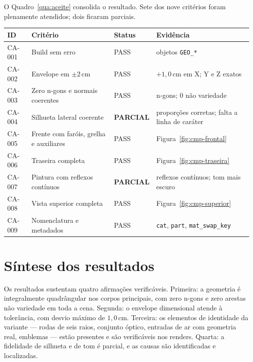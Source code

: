 O Quadro~\ref{qua:aceite} consolida o resultado. Sete dos nove crit\'erios foram plenamente
atendidos; dois ficaram parciais.

\begin{quadro}[htbp]
\centering
\caption{Resultado da verifica{\c{c}}\~ao por crit\'erio de aceita{\c{c}}\~ao}
\label{qua:aceite}
\footnotesize
\begin{tabular}{>{\raggedright\arraybackslash}p{1.4cm}>{\raggedright\arraybackslash}p{5.6cm}>{\raggedright\arraybackslash}p{1.9cm}>{\raggedright\arraybackslash}p{4.0cm}}
\toprule
\textbf{ID} & \textbf{Crit\'erio} & \textbf{Status} & \textbf{Evid\^encia} \\
\midrule
CA-001 & Build sem erro & PASS & 130 objetos \texttt{GEO\_*} \\
CA-002 & Envelope em $\pm2$\,cm & PASS & $+1,0$\,cm em X; Y e Z exatos \\
CA-003 & Zero n-gons e normais coerentes & PASS & 0 n-gons; 0 n\~ao variedade \\
CA-004 & Silhueta lateral coerente & \textbf{PARCIAL} & propor{\c{c}}\~oes corretas; falta a linha de car\'ater \\
CA-005 & Frente com far\'ois, grelha e auxiliares & PASS & Figura~\ref{fig:cmp-frontal} \\
CA-006 & Traseira completa & PASS & Figura~\ref{fig:cmp-traseira} \\
CA-007 & Pintura com reflexos cont\'inuos & \textbf{PARCIAL} & reflexos cont\'inuos; tom mais escuro \\
CA-008 & Vista superior completa & PASS & Figura~\ref{fig:cmp-superior} \\
CA-009 & Nomenclatura e metadados & PASS & \texttt{cat}, \texttt{part}, \texttt{mat\_swap\_key} \\
\bottomrule
\end{tabular}
\end{quadro}

\section{S\'intese dos resultados}

Os resultados sustentam quatro afirma{\c{c}}\~oes verific\'aveis. Primeira: a geometria \'e
integralmente quadr\^angular nos corpos principais, com zero n-gons e zero arestas
n\~ao variedade em toda a cena. Segunda: o envelope dimensional atende \`a toler\^ancia, com
desvio m\'aximo de $1,0$\,cm. Terceira: os elementos de identidade da variante ---
rodas de seis raios, conjunto \'optico, entradas de ar com geometria real, emblemas ---
est\~ao presentes e s\~ao verific\'aveis nos renders. Quarta: a fidelidade de silhueta e de
tom \'e parcial, e as causas s\~ao identificadas e localizadas.

